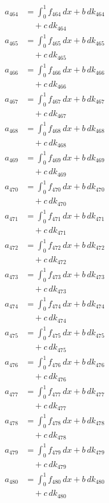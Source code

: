 \documentclass{article}
\begin{document}
\begin{align}
a_{464} &= \int_0^1 f_{464}\,dx + b\,dk_{464} \\
&\quad + c\,dk_{464} \\
a_{465} &= \int_0^1 f_{465}\,dx + b\,dk_{465} \\
&\quad + c\,dk_{465} \\
a_{466} &= \int_0^1 f_{466}\,dx + b\,dk_{466} \\
&\quad + c\,dk_{466} \\
a_{467} &= \int_0^1 f_{467}\,dx + b\,dk_{467} \\
&\quad + c\,dk_{467} \\
a_{468} &= \int_0^1 f_{468}\,dx + b\,dk_{468} \\
&\quad + c\,dk_{468} \\
a_{469} &= \int_0^1 f_{469}\,dx + b\,dk_{469} \\
&\quad + c\,dk_{469} \\
a_{470} &= \int_0^1 f_{470}\,dx + b\,dk_{470} \\
&\quad + c\,dk_{470} \\
a_{471} &= \int_0^1 f_{471}\,dx + b\,dk_{471} \\
&\quad + c\,dk_{471} \\
a_{472} &= \int_0^1 f_{472}\,dx + b\,dk_{472} \\
&\quad + c\,dk_{472} \\
a_{473} &= \int_0^1 f_{473}\,dx + b\,dk_{473} \\
&\quad + c\,dk_{473} \\
a_{474} &= \int_0^1 f_{474}\,dx + b\,dk_{474} \\
&\quad + c\,dk_{474} \\
a_{475} &= \int_0^1 f_{475}\,dx + b\,dk_{475} \\
&\quad + c\,dk_{475} \\
a_{476} &= \int_0^1 f_{476}\,dx + b\,dk_{476} \\
&\quad + c\,dk_{476} \\
a_{477} &= \int_0^1 f_{477}\,dx + b\,dk_{477} \\
&\quad + c\,dk_{477} \\
a_{478} &= \int_0^1 f_{478}\,dx + b\,dk_{478} \\
&\quad + c\,dk_{478} \\
a_{479} &= \int_0^1 f_{479}\,dx + b\,dk_{479} \\
&\quad + c\,dk_{479} \\
a_{480} &= \int_0^1 f_{480}\,dx + b\,dk_{480} \\
&\quad + c\,dk_{480} \\

\end{align}
\end{document}

